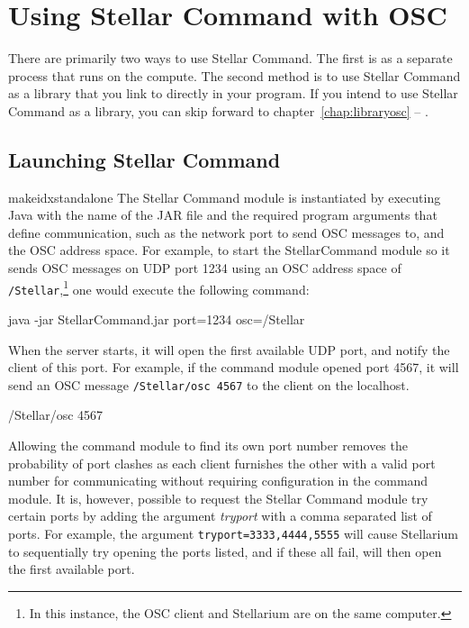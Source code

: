 \chapter{Using Stellar Command with OSC} \label{chap:launchosc}
There are primarily two ways to use Stellar Command. The first is as a separate process that runs on the compute. The second method is to use Stellar Command as a library that you link to directly in your program. If you intend to use Stellar Command as a library, you can skip forward to chapter~\ref{chap:libraryosc} --
\emph{}.


\section{Launching Stellar Command}
makeidx{standalone}
The Stellar Command module is instantiated by executing Java  with the name of the JAR file and the required program arguments that define communication, such as the network port to send OSC messages to, and the OSC address space.  For example, to start the StellarCommand module so it sends OSC messages on UDP port 1234  using an OSC address space of \texttt{/Stellar},\footnote{In this instance, the OSC client and Stellarium are on the same computer.} one would execute the following command:\\

\begin{syntax}

	java -jar StellarCommand.jar port=1234 osc=/Stellar  \\

\end{syntax}
\bigskip
   When the server starts, it will open the first available UDP port, and notify the client of this port. For example, if the command module opened port 4567, it will send an OSC message \texttt{/Stellar/osc 4567} to the client on the localhost. 
   
\begin{syntax}

	/Stellar/osc 4567  \\

\end{syntax}
\bigskip

Allowing the command module to find its own port number removes the probability of port clashes as each client furnishes the other with a valid port number for communicating without requiring configuration in the command module. It is, however, possible to request the Stellar Command module try certain ports by adding the argument \textit{tryport}  with a comma separated list of ports. For example, the argument \texttt{tryport=3333,4444,5555} will cause Stellarium to sequentially try opening the ports listed, and if these all fail, will then open the first available port.\\
   
